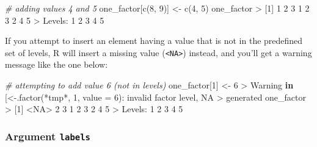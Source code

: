 \documentclass[
]{book}
\newenvironment{Shaded}{\begin{snugshade}}{\end{snugshade}}
\newcommand{\AttributeTok}[1]{\textcolor[rgb]{0.77,0.63,0.00}{#1}}
\newcommand{\CommentTok}[1]{\textcolor[rgb]{0.56,0.35,0.01}{\textit{#1}}}
\newcommand{\ConstantTok}[1]{\textcolor[rgb]{0.00,0.00,0.00}{#1}}
\newcommand{\ControlFlowTok}[1]{\textcolor[rgb]{0.13,0.29,0.53}{\textbf{#1}}}
\newcommand{\DecValTok}[1]{\textcolor[rgb]{0.00,0.00,0.81}{#1}}
\newcommand{\FunctionTok}[1]{\textcolor[rgb]{0.00,0.00,0.00}{#1}}
\newcommand{\NormalTok}[1]{#1}
\newcommand{\OtherTok}[1]{\textcolor[rgb]{0.56,0.35,0.01}{#1}}
\newcommand{\SpecialCharTok}[1]{\textcolor[rgb]{0.00,0.00,0.00}{#1}}
\newcommand{\StringTok}[1]{\textcolor[rgb]{0.31,0.60,0.02}{#1}}
\begin{document}
\begin{Shaded}
\begin{Highlighting}[]
\CommentTok{\# adding values 4 and 5}
\NormalTok{one\_factor[}\FunctionTok{c}\NormalTok{(}\DecValTok{8}\NormalTok{, }\DecValTok{9}\NormalTok{)] }\OtherTok{\textless{}{-}} \FunctionTok{c}\NormalTok{(}\DecValTok{4}\NormalTok{, }\DecValTok{5}\NormalTok{)}
\NormalTok{one\_factor}
\SpecialCharTok{\textgreater{}}\NormalTok{ [}\DecValTok{1}\NormalTok{] }\DecValTok{1} \DecValTok{2} \DecValTok{3} \DecValTok{1} \DecValTok{2} \DecValTok{3} \DecValTok{2} \DecValTok{4} \DecValTok{5}
\SpecialCharTok{\textgreater{}}\NormalTok{ Levels}\SpecialCharTok{:} \DecValTok{1} \DecValTok{2} \DecValTok{3} \DecValTok{4} \DecValTok{5}
\end{Highlighting}
\end{Shaded}

If you attempt to insert an element having a value that is not in the
predefined set of levels, R will insert a missing value (\texttt{\textless{}NA\textgreater{}}) instead, and
you'll get a warning message like the one below:

\begin{Shaded}
\begin{Highlighting}[]
\CommentTok{\# attempting to add value 6 (not in levels)}
\NormalTok{one\_factor[}\DecValTok{1}\NormalTok{] }\OtherTok{\textless{}{-}} \DecValTok{6}
\SpecialCharTok{\textgreater{}}\NormalTok{ Warning }\ControlFlowTok{in} \StringTok{\textasciigrave{}}\AttributeTok{[\textless{}{-}.factor}\StringTok{\textasciigrave{}}\NormalTok{(}\StringTok{\textasciigrave{}}\AttributeTok{*tmp*}\StringTok{\textasciigrave{}}\NormalTok{, }\DecValTok{1}\NormalTok{, }\AttributeTok{value =} \DecValTok{6}\NormalTok{)}\SpecialCharTok{:}\NormalTok{ invalid factor level, }\ConstantTok{NA}
\SpecialCharTok{\textgreater{}}\NormalTok{ generated}
\NormalTok{one\_factor}
\SpecialCharTok{\textgreater{}}\NormalTok{ [}\DecValTok{1}\NormalTok{] }\SpecialCharTok{\textless{}}\ConstantTok{NA}\SpecialCharTok{\textgreater{}} \DecValTok{2}    \DecValTok{3}    \DecValTok{1}    \DecValTok{2}    \DecValTok{3}    \DecValTok{2}    \DecValTok{4}    \DecValTok{5}   
\SpecialCharTok{\textgreater{}}\NormalTok{ Levels}\SpecialCharTok{:} \DecValTok{1} \DecValTok{2} \DecValTok{3} \DecValTok{4} \DecValTok{5}
\end{Highlighting}
\end{Shaded}

\hypertarget{argument-labels}{%
\subsubsection*{\texorpdfstring{Argument \texttt{labels}}{Argument labels}}\label{argument-labels}}
\end{document}
